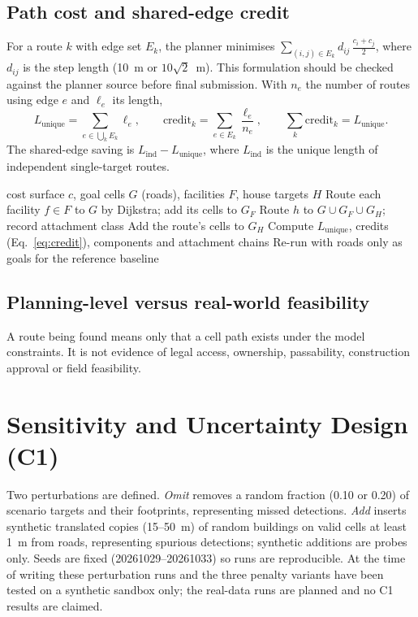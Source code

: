\documentclass[12pt,a4paper]{report}
\begin{document}
\subsection{Path cost and shared-edge credit}
For a route $k$ with edge set $E_k$, the planner minimises $\sum_{(i,j)\in E_k} d_{ij}\,\tfrac{c_i+c_j}{2}$, where $d_{ij}$ is the step length (10~m or $10\sqrt2$~m). This formulation should be checked against the planner source before final submission. With $n_e$ the number of routes using edge $e$ and $\ell_e$ its length,
\begin{equation}\label{eq:credit}
L_{\text{unique}}=\sum_{e\in\bigcup_k E_k}\ell_e,\qquad \text{credit}_k=\sum_{e\in E_k}\frac{\ell_e}{n_e},\qquad \sum_k\text{credit}_k=L_{\text{unique}}.
\end{equation}
The shared-edge saving is $L_{\text{ind}}-L_{\text{unique}}$, where $L_{\text{ind}}$ is the unique length of independent single-target routes.

\begin{algorithm}[ht]
\caption{Two-stage generate-and-select planning (schematic)}\label{alg:plan}
\begin{algorithmic}[1]
\Require cost surface $c$, goal cells $G$ (roads), facilities $F$, house targets $H$
\State Route each facility $f\in F$ to $G$ by Dijkstra; add its cells to $G_F$
 \State Route $h$ to $G\cup G_F\cup G_H$; record attachment class
 \State Add the route's cells to $G_H$
\EndFor
\State Compute $L_{\text{unique}}$, credits (Eq.~\ref{eq:credit}), components and attachment chains
\State Re-run with roads only as goals for the reference baseline
\end{algorithmic}
\end{algorithm}

\subsection{Planning-level versus real-world feasibility}
A route being found means only that a cell path exists under the model constraints. It is not evidence of legal access, ownership, passability, construction approval or field feasibility.

\section{Sensitivity and Uncertainty Design (C1)}
Two perturbations are defined. \emph{Omit} removes a random fraction (0.10 or 0.20) of scenario targets and their footprints, representing missed detections. \emph{Add} inserts synthetic translated copies (15--50~m) of random buildings on valid cells at least 1~m from roads, representing spurious detections; synthetic additions are probes only. Seeds are fixed (20261029--20261033) so runs are reproducible. At the time of writing these perturbation runs and the three penalty variants have been tested on a synthetic sandbox only; the real-data runs are planned and no C1 results are claimed.
\end{document}
